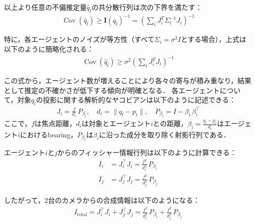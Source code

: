 以上より任意の不偏推定量$\hat{q}_l$の共分散行列は次の下界を満たす：
\begin{equation}
\begin{aligned}
\operatorname{Cov}(\hat{q}_l) \ge \mathbf{I}(q_l)^{-1} = \left( \sum_i J_i^T \Sigma_i^{-1} J_i \right)^{-1}
\end{aligned}
\label{eq:crlb}
\end{equation}

特に，各エージェントのノイズが等方性（すべて$\Sigma_i = \sigma^2 I$とする場合），上式は以下のように簡略化される：
\begin{equation}
\begin{aligned}
\operatorname{Cov}(\hat{q}_l) \ge \sigma^2 \left( \sum_i J_i^T J_i \right)^{-1}
\end{aligned}
\label{eq:crlb_isotropic}
\end{equation}

この式から，エージェント数が増えることにより各々の寄与が積み重なり，結果として推定の不確かさが低下する傾向が明確となる．
各エージェントについて，対象$q_l$の投影に関する解析的なヤコビアンは以下のように記述できる：
\begin{equation}
\begin{aligned}
J_i = \frac{f}{d_i}\,P_{\beta_i}, \quad d_i = \|q_l-p_i\|, \quad P_{\beta_i} = I - \beta_i\,\beta_i^\top
\end{aligned}
\label{eq:jacobian}
\end{equation}
ここで，$f$は焦点距離，$d_i$は対象とエージェント$i$との距離，$\beta_i = \frac{q_l-p_i}{d_i}$はエージェント$i$におけるbearing，$P_{\beta_i}$は$\beta_i$に沿った成分を取り除く射影行列である．

エージェント$i$と$j$からのフィッシャー情報行列は以下のように計算できる：
\begin{equation}
\begin{aligned}
I_i &= J_i^\top J_i = \frac{f^2}{d_i^2}\,P_{\beta_i} \\
I_j &= J_j^\top J_j = \frac{f^2}{d_j^2}\,P_{\beta_j}
\end{aligned}
\label{eq:fim_individual}
\end{equation}

したがって，2台のカメラからの合成情報は以下のようになる：
\begin{equation}
\begin{aligned}
I_{\text{total}} = J_i^\top J_i + J_j^\top J_j = \frac{f^2}{d_i^2}\,P_{\beta_i} + \frac{f^2}{d_j^2}\,P_{\beta_j}
\end{aligned}
\label{eq:fim_total}
\end{equation}

